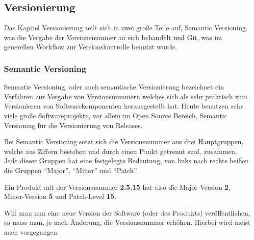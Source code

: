 \subsection{Versionierung}
Das Kapitel Versionierung teilt sich in zwei große Teile auf, Semantic Versioning, was die Vergabe der Versionsnummer an sich behandelt und Git, was im generellen Workflow zur Versionskontrolle benutzt wurde.

\subsubsection{Semantic Versioning}
Semantic Versioning, oder auch semantische Versionierung bezeichnet ein Verfahren zur Vergabe von Versionsnummern welches sich als sehr praktisch zum Versionieren von Softwarekomponenten herausgestellt hat. Heute benutzen sehr viele große Softwareprojekte, vor allem im Open Source Bereich, Semantic Versioning für die Versionierung von Releases.

Bei Semantic Versioning setzt sich die Versionsnummer aus drei Hauptgruppen, welche aus Ziffern bestehen und durch einen Punkt getrennt sind, zusammen. Jede dieser Gruppen hat eine festgelegte Bedeutung, von links nach rechts heißen die Gruppen \enquote{Major}, \enquote{Minor} und \enquote{Patch}.

Ein Produkt mit der Versionsnummer \textbf{2.5.15} hat also die Major-Version \textbf{2}, Minor-Version \textbf{5} und Patch-Level \textbf{15}.

Will man nun eine neue Version der Software (oder des Produkts) veröffentlichen, so muss man, je nach Änderung, die Versionsnummer erhöhen. Hierbei wird meist nach  vorgegangen.


